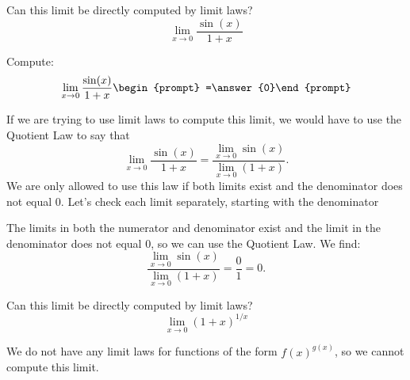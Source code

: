 \documentclass{ximera}
\begin{document}
\begin{question}
  Can this limit be directly computed by limit laws?
  \[
  \displaystyle\lim_{x\to 0} \frac{\sin(x)}{1+x}
  \]
  \begin{multipleChoice}
  \end{multipleChoice}
  \begin{question}
    Compute:
    \[
    \displaystyle\lim_{x\to 0} \frac{\sin(x)}{1+x}\begin{prompt} =\answer{0}\end{prompt}
    \]
    \begin{feedback}
      If we are trying to use limit laws to compute this limit, we
      would have to use the Quotient Law to say that
      \[
      \displaystyle\lim_{x\to 0} \frac{\sin(x)}{1+x} = \frac{\lim_{x\to
          0}\sin(x)}{\lim_{x\to 0}(1+x)}.
      \]
      We are only allowed to use this law if both limits exist and the
      denominator does not equal $0$.  Let's check each limit
      separately, starting with the denominator
      
      The limits in both the numerator and denominator exist and the
      limit in the denominator does not equal $0$, so we can use the
      Quotient Law.  We find:
      \[
        \displaystyle \frac{\lim_{x\to 0}\sin(x)}{\lim_{x\to 0}(1+x)}=\frac{0}{1}=0.
        \]
    \end{feedback}
  \end{question}
\end{question}


\begin{question}
  Can this limit be directly computed by limit laws?
  \[
  \lim_{x\to 0}(1+x)^{1/x}
  \]
  \begin{multipleChoice}
  \end{multipleChoice}
  \begin{feedback}
  We do not have any limit laws for functions of the form $f(x)^{g(x)}$, so we cannot compute this limit.
  \end{feedback}
\end{question}
\end{document}
